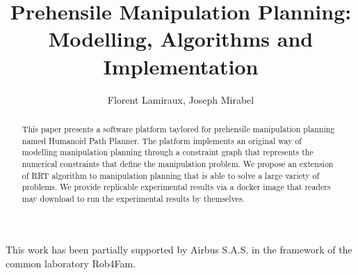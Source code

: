\documentclass[Afour,sageh,times,doublespace]{sagej}
\begin{document}

\title{Prehensile Manipulation Planning: Modelling, Algorithms and Implementation}

\author{Florent Lamiraux, Joseph Mirabel}




\begin{abstract}
  This paper presents a software platform taylored for prehensile manipulation
  planning named Humanoid Path Planner. The platform implements an original way
  of modelling manipulation planning through a constraint graph that represents
  the numerical constraints that define the manipulation problem. We propose an
  extension of RRT algorithm to manipulation planning that is able to solve a
  large variety of problems. We provide replicable experimental results via a
  docker image that readers may download to run the experimental results by
  themselves.
\end{abstract}


\maketitle



\begin{acks}
This work has been partially supported by Airbus S.A.S. in the framework of the common laboratory Rob4Fam.
\end{acks}

%



\end{document}
